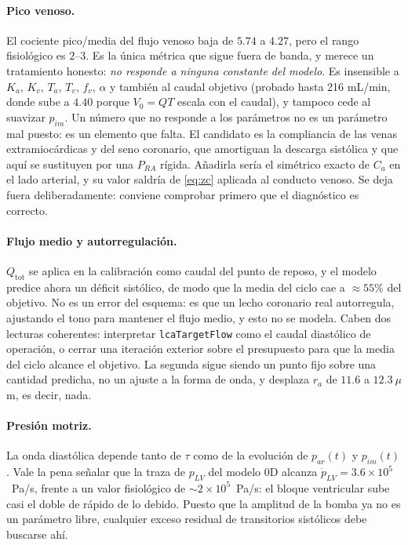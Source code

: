 \documentclass[11pt]{article}
\begin{document}
\paragraph{Pico venoso.} El cociente pico/media del flujo venoso baja de $5.74$
a $4.27$, pero el rango fisiol\'ogico es $2$--$3$. Es la \'unica m\'etrica que
sigue fuera de banda, y merece un tratamiento honesto: \emph{no responde a
ninguna constante del modelo}. Es insensible a $K_a$, $K_v$, $T_a$, $T_v$,
$f_v$, $\alpha$ y tambi\'en al caudal objetivo (probado hasta 216 mL/min, donde
sube a $4.40$ porque $V_0=QT$ escala con el caudal), y tampoco cede al suavizar
$p_{im}$. Un n\'umero que no responde a los par\'ametros no es un par\'ametro
mal puesto: es un elemento que falta. El candidato es la compliancia de las
venas extramioc\'ardicas y del seno coronario, que amortiguan la descarga
sist\'olica y que aqu\'i se sustituyen por una $P_{RA}$ r\'igida. A\~nadirla
ser\'ia el sim\'etrico exacto de $C_a$ en el lado arterial, y su valor saldr\'ia
de \eqref{eq:zc} aplicada al conducto venoso. Se deja fuera deliberadamente:
conviene comprobar primero que el diagn\'ostico es correcto.

\paragraph{Flujo medio y autorregulaci\'on.} $Q_{\text{tot}}$ se aplica en la
calibraci\'on como caudal del punto de reposo, y el modelo predice ahora un
d\'eficit sist\'olico, de modo que la media del ciclo cae a $\approx55\%$ del
objetivo. No es un error del esquema: es que un lecho coronario real
autorregula, ajustando el tono para mantener el flujo medio, y esto no se
modela. Caben dos lecturas coherentes: interpretar \texttt{lcaTargetFlow} como
el caudal diast\'olico de operaci\'on, o cerrar una iteraci\'on exterior sobre
el presupuesto para que la media del ciclo alcance el objetivo. La segunda
sigue siendo un punto fijo sobre una cantidad predicha, no un ajuste a la forma
de onda, y desplaza $r_a$ de $11.6$ a $12.3~\mu$m, es decir, nada.

\paragraph{Presi\'on motriz.} La onda diast\'olica depende tanto de $\tau$ como
de la evoluci\'on de $p_{ar}(t)$ y $p_{im}(t)$. Vale la pena se\~nalar que la
traza de $p_{LV}$ del modelo 0D alcanza $\dot p_{LV}=3.6\times10^{5}$~Pa/s,
frente a un valor fisiol\'ogico de $\sim2\times10^{5}$~Pa/s: el bloque
ventricular sube casi el doble de r\'apido de lo debido. Puesto que la amplitud
de la bomba ya no es un par\'ametro libre, cualquier exceso residual de
transitorios sist\'olicos debe buscarse ah\'i.
\end{document}
